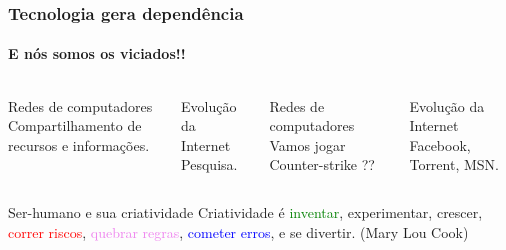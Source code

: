 \documentclass[xcolor=svgnames,8pt]{beamer}
\begin{document}
\begin{frame}
    \frametitle{Tecnologia gera dependência}
    \framesubtitle{E nós somos os viciados!!}
    
    \begin{columns}
        
        \center{\textcolor{red}{ANTES}}
        \begin{block}{Redes de computadores}
            Compartilhamento de recursos e informações.
        \end{block}     
        
        \begin{block}{Evolução da Internet}
            Pesquisa.
        \end{block}
        
        \center{\textcolor{red}{DEPOIS}}
        \begin{block}{Redes de computadores}
            Vamos jogar Counter-strike ??
        \end{block}     
        
        \begin{block}{Evolução da Internet}
            Facebook, Torrent, MSN.
        \end{block}
        
    \end{columns}
    
    \begin{alertblock}{Ser-humano e sua criatividade}
        Criatividade é \textcolor{green}{inventar}, experimentar, crescer, \textcolor{red}{correr riscos}, \textcolor{violet}{quebrar regras}, 
        \textcolor{blue}{cometer erros}, e se divertir. (Mary Lou Cook)
    \end{alertblock}
\end{frame}
\end{document}

